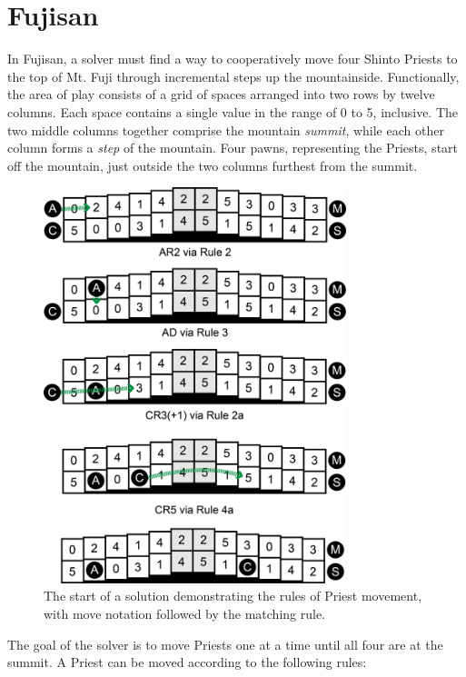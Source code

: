 \documentclass[journal]{IEEEtran}
\begin{document}

\section{Fujisan}

In Fujisan, a solver must find a way to cooperatively move four Shinto Priests to the top of Mt. Fuji through incremental steps up the mountainside. Functionally, the area of play consists of a grid of spaces arranged into two rows by twelve columns. Each space contains a single value in the range of 0 to 5, inclusive. The two middle columns together comprise the mountain {\it summit}, while each other column forms a {\it step} of the mountain. Four pawns, representing the Priests, start off the mountain, just outside the two columns furthest from the summit.

\begin{figure}[t]
\centering
\includegraphics[width=8.8cm]{priestrulesfixed.png}
\caption{The start of a solution demonstrating the rules of Priest movement, with move notation followed by the matching rule. }
\label{fig:priestrules}
\end{figure}

The goal of the solver is to move Priests one at a time until all four are at the summit. A Priest can be moved according to the following rules:  
\end{document}
